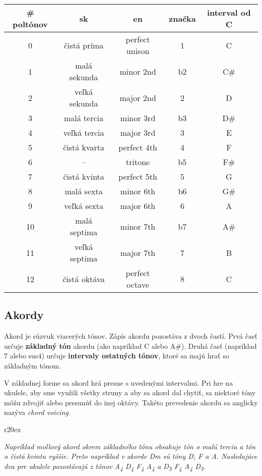 \begin{center}
\begin{tabular}{ c c c c c }
    \# poltónov & sk & en & značka & interval od C \\
    \hline
    0 & čistá príma & perfect unison & 1 & C \\
    1 & malá sekunda & minor 2nd & b2 & C\# \\
    2 & veľká sekunda & major 2nd & 2 & D \\
    3 & malá tercia & minor 3rd & b3 & D\# \\
    4 & veľká tercia & major 3rd & 3 & E \\
    5 & čistá kvarta & perfect 4th & 4 & F \\
    6 & -- & tritone & b5 & F\# \\
    7 & čistá kvinta & perfect 5th & 5 & G \\
    8 & malá sexta & minor 6th & b6 & G\# \\
    9 & veľká sexta & major 6th & 6 & A \\
    10 & malá septima & minor 7th & b7 & A\# \\
    11 & veľká septima & major 7th & 7 & B \\
    12 & čistá oktáva & perfect octave & 8 & C \\
\end{tabular}
\end{center}


\subsection*{Akordy}

Akord je súzvuk viacerých tónov. Zápis akordu pozostáva z dvoch častí. Prvá časť
určuje \textbf{základný tón} akordu (ako napríklad C alebo A\#). Druhá časť (napríklad 7 alebo sus4)
určuje \textbf{intervaly ostatných tónov}, ktoré sa majú hrať so základným tónom.

V základnej forme sa akord hrá presne s uvedenými intervalmi. Pri hre na ukulele, aby sme využili
všetky struny a aby sa akord dal chytiť, sa niektoré tóny môžu zdvojiť alebo presunúť do inej
oktávy. Takéto prevedenie akordu sa anglicky nazýva \textit{chord voicing}.

\begin{wrapfigure}{r}{20ex}
\begin{center}
\vspace{-3ex}
\smaller
\smaller
{} \qquad {}
\vspace{-3.5ex}
\end{center}
\end{wrapfigure}
\textit{%
Napríklad mollový akord okrem základného tónu obsahuje tón o malú terciu a tón o čistú kvintu vyššie. Preto napríklad v akorde Dm sú tóny D, F a A. Nasledujúce
dva  pre ukulele pozostávajú z tónov A\textsubscript{4} D\textsubscript{4} F\textsubscript{4} A\textsubscript{4}
a D\textsubscript{5} F\textsubscript{4} A\textsubscript{4} D\textsubscript{5}.
}

